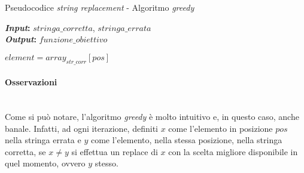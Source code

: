 \begin{algorithm}[!h]
    \captionsetup{labelformat=empty}
    \caption{Pseudocodice \textit{string replacement} - Algoritmo \textit{greedy}}
    \vspace{0.1cm}
    \hspace*{\algorithmicindent} \textbf{\textit{Input}:} {$stringa\_corretta$}, {$stringa\_errata$}\\
    \hspace*{\algorithmicindent} \textbf{\textit{Output}:} {$funzione\_obiettivo$}
    \begin{algorithmic}[1]
                \State $element = array_{str\_corr}[pos]$
            \EndIf
        \EndFor
        \State {}
        \EndProcedure
    \end{algorithmic}
\end{algorithm}

\noindent \paragraph{Osservazioni}\hfill\\
Come si può notare, l'algoritmo \textit{greedy} è molto intuitivo e, in questo caso,
anche banale.
Infatti, ad ogni iterazione, definiti $x$ come l'elemento in posizione $pos$ nella
stringa errata e $y$ come l'elemento, nella stessa posizione, nella stringa corretta,
se $x \neq y$ si effettua un replace di $x$ con la scelta migliore disponibile
in quel momento, ovvero $y$ stesso.

